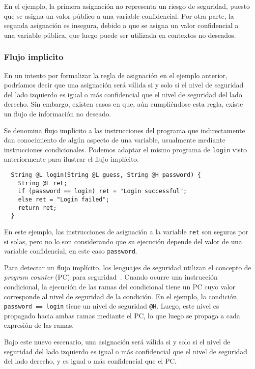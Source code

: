 En el ejemplo, la primera asignación no representa un riesgo de seguridad, puesto que se asigna un valor público a una variable confidencial. Por otra parte, la segunda asignación es insegura, debido a que se asigna un valor confidencial a una variable pública, que luego puede ser utilizada en contextos no deseados.
\subsubsection{Flujo implicito}
En un intento por formalizar la regla de asignación en el ejemplo anterior, podríamos decir que una asignación será válida si y solo si el nivel de seguridad del lado izquierdo es igual o más confidencial que el nivel de seguridad del lado derecho. Sin embargo, existen casos en que, aún cumpliéndose esta regla, existe un flujo de información no deseado.

Se denomina flujo implícito a las instrucciones del programa que indirectamente dan conocimiento de algún aspecto de una variable, usualmente mediante instrucciones condicionales. Podemos adaptar el mismo programa de \texttt{login} visto anteriormente para ilustrar el flujo implícito.

\begin{lstlisting}
  String @L login(String @L guess, String @H password) {
    String @L ret;
    if (password == login) ret = "Login successful";
    else ret = "Login failed";
    return ret;
  }
\end{lstlisting}

En este ejemplo, las instrucciones de asignación a la variable \texttt{ret} son seguras por si solas, pero no lo son considerando que su ejecución depende del valor de una variable confidencial, en este caso \texttt{password}.

Para detectar un flujo implícito, los lenguajes de seguridad utilizan el concepto de \textit{program counter} (PC) para seguridad~\cite{pc}. Cuando ocurre una instrucción condicional, la ejecución de las ramas del condicional tiene un PC cuyo valor corresponde al nivel de seguridad de la condición. En el ejemplo, la condición \texttt{password == login} tiene un nivel de seguridad \texttt{@H}. Luego, este nivel es propagado hacia ambas ramas mediante el PC, lo que luego se propaga a cada expresión de las ramas.

Bajo este nuevo escenario, una asignación será válida si y solo si el nivel de seguridad del lado izquierdo es igual o más confidencial que el nivel de seguridad del lado derecho, y es igual o más confidencial que el PC.

